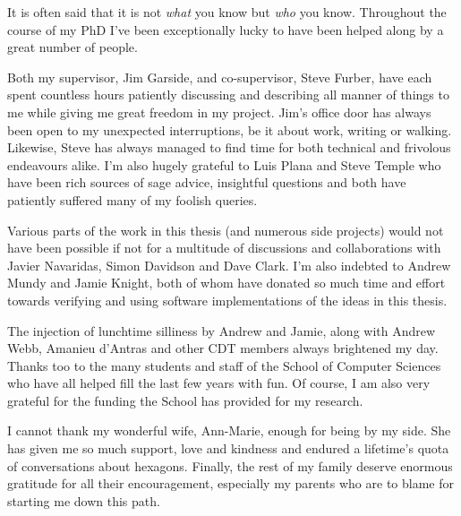 {
	
	
	It is often said that it is not \emph{what} you know but \emph{who} you know.
	Throughout the course of my PhD I've been exceptionally lucky to have been
	helped along by a great number of people.
	
	Both my supervisor, Jim Garside, and co-supervisor, Steve Furber, have each
	spent countless hours patiently discussing and describing all manner of
	things to me while giving me great freedom in my project. Jim's office door
	has always been open to my unexpected interruptions, be it about work,
	writing or walking.  Likewise, Steve has always managed to find time for both
	technical and frivolous endeavours alike. I'm also hugely grateful to Luis
	Plana and Steve Temple who have been rich sources of sage advice, insightful
	questions and both have patiently suffered many of my foolish queries.
	
	Various parts of the work in this thesis (and numerous side projects) would
	not have been possible if not for a multitude of discussions and
	collaborations with Javier Navaridas, Simon Davidson and Dave Clark. I'm also
	indebted to Andrew Mundy and Jamie Knight, both of whom have donated so much
	time and effort towards verifying and using software implementations of the
	ideas in this thesis.
	
	The injection of lunchtime silliness by Andrew and Jamie, along with Andrew
	Webb, Amanieu d'Antras and other CDT members always brightened my day.
	Thanks too to the many students and staff of the School of Computer Sciences
	who have all helped fill the last few years with fun. Of course, I am also
	very grateful for the funding the School has provided for my research.
	
	I cannot thank my wonderful wife, Ann-Marie, enough for being by my side. She
	has given me so much support, love and kindness and endured a lifetime's
	quota of conversations about hexagons. Finally, the rest of my family deserve
	enormous gratitude for all their encouragement, especially my parents who are
	to blame for starting me down this path.
	
	\par%
}
